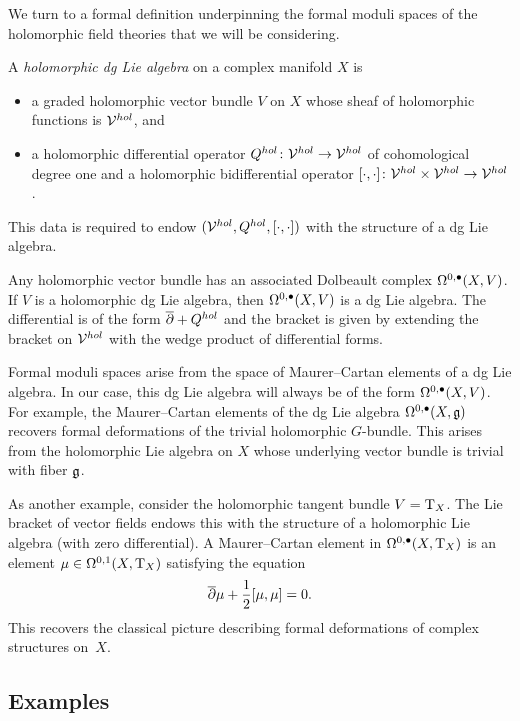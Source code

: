 \documentclass[11pt]{amsart}
\begin{document}
We turn to a formal definition underpinning the formal moduli spaces of the holomorphic field theories that we will be considering. 

\begin{dfn}
A {\em holomorphic dg Lie algebra} on a complex manifold $X$ is
\begin{itemize}
\item a graded holomorphic vector bundle $V$ on $X$ whose sheaf of holomorphic functions is $\mathcal V^{hol}$, and
\item a holomorphic differential operator $Q^{hol} \colon \mathcal V^{hol} \to \mathcal V^{hol}$ of cohomological degree one and a holomorphic bidifferential operator $[\cdot,\cdot] \colon \mathcal V^{hol} \times \mathcal V^{hol} \to \mathcal V^{hol}$. 
\end{itemize}
This data is required to endow $(\mathcal V^{hol}, Q^{hol}, [\cdot,\cdot])$ with the structure of a dg Lie algebra.
\end{dfn}

Any holomorphic vector bundle has an associated Dolbeault complex $\Omega^{0,\bullet}(X,V)$. 
If $V$ is a holomorphic dg Lie algebra, 
then $\Omega^{0,\bullet}(X, V)$ is a dg Lie algebra. 
The differential is of the form ${\overline{\partial}} + Q^{hol}$ and the bracket is given by extending the bracket on $\mathcal V^{hol}$ with the wedge product of differential forms. 

Formal moduli spaces arise from the space of Maurer--Cartan elements of a dg Lie algebra.
In our case, this dg Lie algebra will always be of the form $\Omega^{0,\bullet}(X, V)$.
For example, the Maurer--Cartan elements of the dg Lie algebra $\Omega^{0,\bullet}(X, \mathfrak g)$ recovers formal deformations of the trivial holomorphic $G$-bundle.  
This arises from the holomorphic Lie algebra on $X$ whose underlying vector bundle is trivial with fiber $\mathfrak g$. 

As another example, consider the holomorphic tangent bundle $V = {\rm T}_X$. 
The Lie bracket of vector fields endows this with the structure of a holomorphic Lie algebra (with zero differential). 
A Maurer--Cartan element in $\Omega^{0,\bullet}(X, {\rm T}_X)$ is an element $\mu \in \Omega^{0,1}(X, {\rm T}_X)$ satisfying the equation
\[
{\overline{\partial}} \mu + \frac12 [\mu,\mu] = 0 .
\]
This recovers the classical picture describing formal deformations of complex structures on~$X$.



\subsection{Examples}
\end{document}
